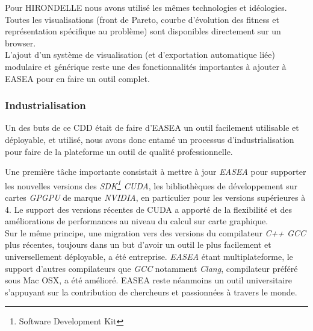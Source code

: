 \documentclass[french, 11pt]{memoir}
\begin{document}
\bigskip
Pour HIRONDELLE nous avons utilisé les mêmes technologies et idéologies.
Toutes les visualisations (front de Pareto, courbe d'évolution des
fitness et représentation spécifique au problème) sont disponibles
directement sur un browser. \\
L'ajout d'un système de visualisation (et d'exportation automatique
liée) modulaire et générique reste une des fonctionnalités importantes à
ajouter à EASEA pour en faire un outil complet.

\subsubsection{Industrialisation}\label{industrialisation}

Un des buts de ce CDD était de faire d'EASEA un outil facilement
utilisable et déployable, et utilisé, nous avons donc entamé un
processus d'industrialisation pour faire de la plateforme un outil de
qualité professionnelle.

\bigskip
Une première tâche importante consistait à mettre à jour \emph{EASEA}
pour supporter les nouvelles versions des \emph{SDK\footnote{Software Development Kit} CUDA}, les
bibliothèques de développement sur cartes \emph{GPGPU} de marque
\textit{NVIDIA}, en particulier pour les versions supérieures à 4. Le
support des versions récentes de CUDA a apporté de la flexibilité et des
améliorations de performances au niveau du calcul sur carte
graphique. \\
Sur le même principe, une migration vers des versions du
compilateur \textit{C++ GCC} plus récentes, toujours dans un but d'avoir un
outil le plus facilement et universellement déployable, a été
entreprise. \emph{EASEA} étant multiplateforme, le support d'autres
compilateurs que \emph{GCC} notamment \emph{Clang}, compilateur préféré
sous Mac OSX, a été amélioré. EASEA reste néanmoins un outil universitaire s'appuyant sur la
contribution de chercheurs et passionnées à travers le monde.
\end{document}
